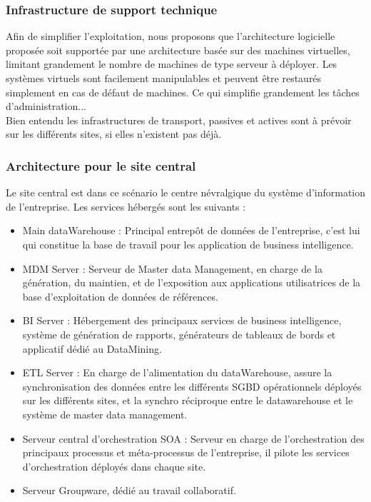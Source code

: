 \subsubsection{Infrastructure de support technique}
Afin de simplifier l'exploitation, nous proposons que l'architecture logicielle proposée soit supportée par une architecture basée sur des machines virtuelles, limitant grandement le nombre de machines de type serveur à déployer.
Les systèmes virtuels sont facilement manipulables et peuvent être restaurés simplement en cas de défaut de machines. Ce qui simplifie grandement les tâches d'administration...\\
Bien entendu les infrastructures de transport, passives et actives sont à prévoir sur les différents sites, si elles n'existent pas déjà.

\subsubsection{Architecture pour le site central}

Le site central est dans ce scénario le centre névralgique du système d'information de l'entreprise. Les services hébergés sont les suivants :\\

\begin{itemize}
\item Main dataWarehouse : Principal entrepôt de données de l'entreprise, c'est lui qui constitue la base de travail pour les application de business intelligence.
\item MDM Server :  Serveur de Master data Management, en charge de la génération, du maintien, et de l'exposition aux applications utilisatrices de la base d'exploitation de données de références.
\item BI Server : Hébergement des principaux services de business intelligence, système de génération de rapports, générateurs de tableaux de bords et applicatif dédié au DataMining.
\item ETL Server : En charge de l'alimentation du dataWarehouse, assure la synchronisation des données entre les différents SGBD opérationnels déployés sur les différents sites, et la synchro réciproque entre le datawarehouse et le système de master data management.
\item Serveur central d'orchestration SOA : Serveur en charge de l'orchestration des principaux processus et méta-processus de l'entreprise, il pilote les services d'orchestration déployés dans chaque site.
\item Serveur Groupware, dédié au travail collaboratif.
\end{itemize}

